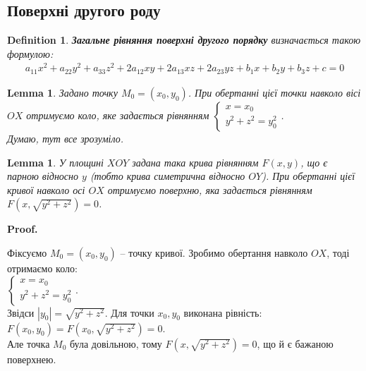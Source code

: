 \documentclass[a4paper, 10pt]{extarticle}
\makeatletter
\def\qed{$\blacksquare$}
\def\qed{$\blacksquare$}
\theoremstyle{theoremdd}
\theoremstyle{theoremdd}
\newtheorem{definition}[theorem]{Definition}
\theoremstyle{theoremdd}
\theoremstyle{theoremdd}
\theoremstyle{theoremdd}
\theoremstyle{theoremdd}
\theoremstyle{theoremdd}
\newtheorem{lemma}[theorem]{Lemma}
\theoremstyle{theoremdd}
\renewenvironment{proof}[1][Proof.\\]{\par
\pushQED{\hfill \qed}%
\normalfont \topsep6\p@\@plus6\p@\relax
\trivlist
\item\relax
{\bfseries
#1\@addpunct{.}}\hspace\labelsep\ignorespaces
}{%
\popQED\endtrivlist\@endpefalse
}
\makeatother
\begin{document}
\subsection{Поверхні другого роду}
\begin{definition}
\textbf{Загальне рівняння поверхні другого порядку} визначається такою формулою:
\begin{align*}
a_{11}x^2 + a_{22}y^2 + a_{33}z^2 + 2a_{12}xy + 2a_{13}xz + 2a_{23}yz + b_1x + b_2y + b_3z + c = 0
\end{align*}
\end{definition}

\begin{lemma}
Задано точку $M_0 = (x_0,y_0)$. При обертанні цієї точки навколо вісі $OX$ отримуємо коло, яке задається рівнянням $\begin{cases}
x = x_0 \\
y^2 + z^2 = y_0^2
\end{cases}
$.\\
\textit{Думаю, тут все зрозуміло}.
\begin{figure}[H]
\centering
{}
\end{figure}
\end{lemma}

\begin{lemma}
У площині $XOY$ задана така крива рівнянням $F(x,y)$, що є парною відносно $y$ (тобто крива симетрична відносно $OY$). При обертанні цієї кривої навколо осі $OX$ отримуємо поверхню, яка задається рівнянням $F(x,\sqrt{y^2+z^2})=0$.
\end{lemma}

\begin{proof}
Фіксуємо $M_0 = (x_0,y_0)$ -- точку кривої. Зробимо обертання навколо $OX$, тоді отримаємо коло:\\
$\begin{cases}
x = x_0 \\
y^2 + z^2 = y_0^2
\end{cases}
$.\\
Звідси $|y_0| = \sqrt{y^2+z^2}$. Для точки $x_0,y_0$ виконана рівність: $F(x_0,y_0) = F(x_0, \sqrt{y^2+z^2}) = 0$.\\
Але точка $M_0$ була довільною, тому $F(x,\sqrt{y^2+z^2})=0$, що й є бажаною поверхнею.
\end{proof}
\end{document}
